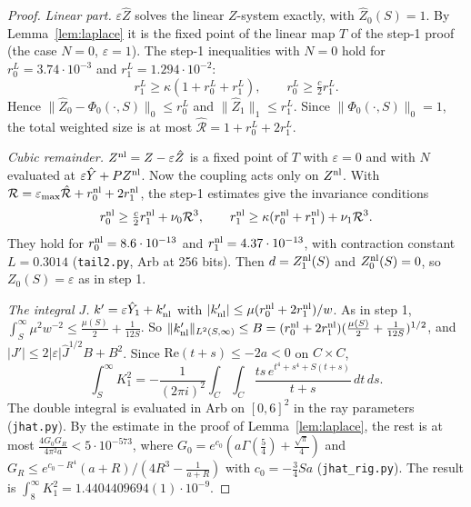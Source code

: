 \documentclass[11pt]{amsart}
\theoremstyle{remark}
\newcommand{\eps}{\varepsilon}
\begin{document}
\begin{proof}
\emph{Linear part.} $\eps\hat Z$ solves the linear $Z$-system exactly, with $\hat Z_0(S)=1$. By Lemma~\ref{lem:laplace} it is the fixed point of the linear map $T$ of the step-1 proof (the case $N=0$, $\eps=1$). The step-1 inequalities with $N=0$ hold for $r_0^L=3.74\cdot10^{-3}$ and $r_1^L=1.294\cdot10^{-2}$:
\[
r_1^L\ge\kappa(1+r_0^L+r_1^L),\qquad r_0^L\ge\tfrac c2r_1^L .
\]
Hence $\|\hat Z_0-\Phi_0(\cdot,S)\|_0\le r_0^L$ and $\|\hat Z_1\|_1\le r_1^L$. Since $\|\Phi_0(\cdot,S)\|_0=1$, the total weighted size is at most $\hat{\mathcal R}=1+r_0^L+2r_1^L$.

\emph{Cubic remainder.} $Z^{\rm nl}=Z-\eps\hat Z$ is a fixed point of $T$ with $\eps=0$ and with $N$ evaluated at $\eps\hat Y+PZ^{\rm nl}$. Now the coupling acts only on $Z^{\rm nl}$. With $\mathcal R=\eps_{\max}\hat{\mathcal R}+r_0^{\rm nl}+2r_1^{\rm nl}$, the step-1 estimates give the invariance conditions
\[
r_0^{\rm nl}\ge\tfrac c2r_1^{\rm nl}+\nu_0\mathcal R^3,\qquad r_1^{\rm nl}\ge\kappa(r_0^{\rm nl}+r_1^{\rm nl})+\nu_1\mathcal R^3 .
\]
They hold for $r_0^{\rm nl}=8.6\cdot10^{-13}$ and $r_1^{\rm nl}=4.37\cdot10^{-13}$, with contraction constant $L=0.3014$ (\texttt{tail2.py}, Arb at 256 bits). Then $d=Z_1^{\rm nl}(S)$ and $Z^{\rm nl}_0(S)=0$, so $Z_0(S)=\eps$ as in step 1.

\emph{The integral $J$.} $k'=\eps\hat Y_1+k'_{\rm nl}$ with $|k'_{\rm nl}|\le\mu(r_0^{\rm nl}+2r_1^{\rm nl})/w$. As in step 1, $\int_S^\infty\mu^2w^{-2}\le\frac{\mu(S)}2+\frac1{12S}$. So $\|k'_{\rm nl}\|_{L^2(S,\infty)}\le B=(r_0^{\rm nl}+2r_1^{\rm nl})(\frac{\mu(S)}2+\frac1{12S})^{1/2}$, and $|J'|\le2|\eps|\hat J^{1/2}B+B^2$. Since $\mathrm{Re}(t+s)\le-2a<0$ on $C\times C$,
\[
\int_S^\infty K_1^2=-\frac1{(2\pi i)^2}\int_C\!\int_C\frac{ts\,e^{t^4+s^4+S(t+s)}}{t+s}\,dt\,ds .
\]
The double integral is evaluated in Arb on $[0,6]^2$ in the ray parameters (\texttt{jhat.py}). By the estimate in the proof of Lemma~\ref{lem:laplace}, the rest is at most $\frac{4G_0G_R}{4\pi^2a}<5\cdot10^{-573}$, where $G_0=e^{c_0}(a\Gamma(\frac54)+\frac{\sqrt\pi}4)$ and $G_R\le e^{c_0-R^4}(a+R)/(4R^3-\frac1{a+R})$ with $c_0=-\frac34Sa$ (\texttt{jhat\_rig.py}). The result is $\int_8^\infty K_1^2=1.4404409694(1)\cdot10^{-9}$.
\end{proof}
\end{document}
